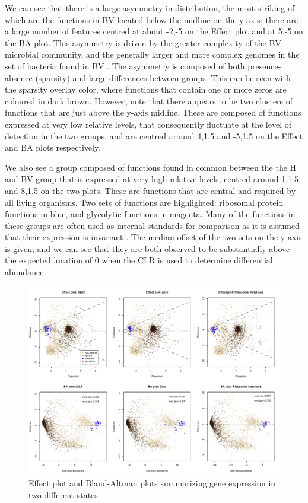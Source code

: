 \documentclass[10pt]{article}
\begin{document}
We can see that there is a large asymmetry in distribution, the most striking of which are the functions in BV located below the midline on the y-axis; there are a large number of features centred at about -2,-5 on the Effect plot and at 5,-5 on the BA plot. This asymmetry is driven by the greater complexity of the BV microbial community, and the generally larger and more complex genomes in the set of bacteria found in BV . The asymmetry is composed of both presence-absence (sparsity) and large differences between groups. This can be seen with the sparsity overlay color, where functions that contain one or more zeros are coloured in dark brown. However, note that there appears to be two clusters of functions that are just above the y-axis midline. These are composed of functions expressed at very low relative levels, that consequently fluctuate at the level of detection in the two groups, and are centred around 4,1.5 and -5,1.5 on the Effect and BA plots respectively. 

We also see a group composed of functions found in common between the the H and BV group that is  expressed at very high relative levels, centred around 1,1.5 and 8,1.5 on the two plots. These are functions that are central and required by all living organisms. Two sets of functions are highlighted: ribosomal protein functions in blue, and glycolytic functions in magenta. Many of the functions in these groups are often used as internal standards for comparison as it is assumed that their expression is invariant . The median offset of the two sets on the y-axis is given, and we can see that they are both observed to be substantially above the expected location of 0 when the CLR is used to determine differential abundance.   

\begin{figure}[ht]
\includegraphics[width=5in]{twtyfr_corr.pdf}
\caption{Effect plot and Bland-Altman plots summarizing gene expression in two different states. }
\label{Fig:ribo}
\end{figure}
\end{document}
